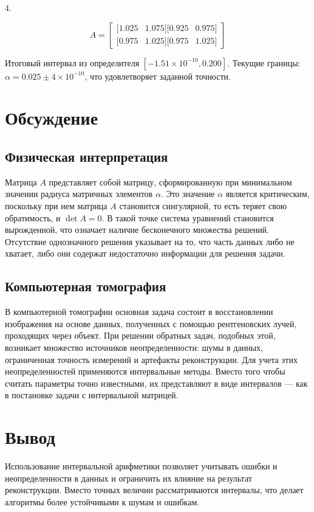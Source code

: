 \documentclass[a4paper,12pt]{article}
\begin{document}
\begin{alignleft}
4.

\[
A = \begin{bmatrix}
[1.025 & 1.075]
[0.925 & 0.975] \\
[0.975 & 1.025]
[0.975 & 1.025]
\end{bmatrix} \tag{22}
\]

Итоговый интервал из определителя \([-1.51 \times 10^{-10}, 0.200]\). Текущие границы: \(\alpha = 0.025 \pm 4 \times 10^{-10}\), что удовлетворяет заданной точности.


\end{alignleft}

\section{Обсуждение}

\subsection{Физическая интерпретация}

Матрица \(A\) представляет собой матрицу, сформированную при минимальном значении радиуса матричных элементов \(\alpha\). Это значение \(\alpha\) является критическим, поскольку при нем матрица \(A\) становится сингулярной, то есть теряет свою обратимость, и \(\det A = 0\). В такой точке система уравнений становится вырожденной, что означает наличие бесконечного множества решений. Отсутствие однозначного решения указывает на то, что часть данных либо не хватает, либо они содержат недостаточно информации для решения задачи.

\subsection{Компьютерная томография}

В компьютерной томографии основная задача состоит в восстановлении изображения на основе данных, полученных с помощью рентгеновских лучей, проходящих через объект. При решении обратных задач, подобных этой, возникает множество источников неопределенности: шумы в данных, ограниченная точность измерений и артефакты реконструкции. Для учета этих неопределенностей применяются интервальные методы. Вместо того чтобы считать параметры точно известными, их представляют в виде интервалов — как в постановке задачи с интервальной матрицей. \\


\section{Вывод}
Использование интервальной арифметики позволяет учитывать ошибки и неопределенности в данных и ограничить их влияние на результат реконструкции. Вместо точных величин рассматриваются интервалы, что делает алгоритмы более устойчивыми к шумам и ошибкам.
\end{document}
